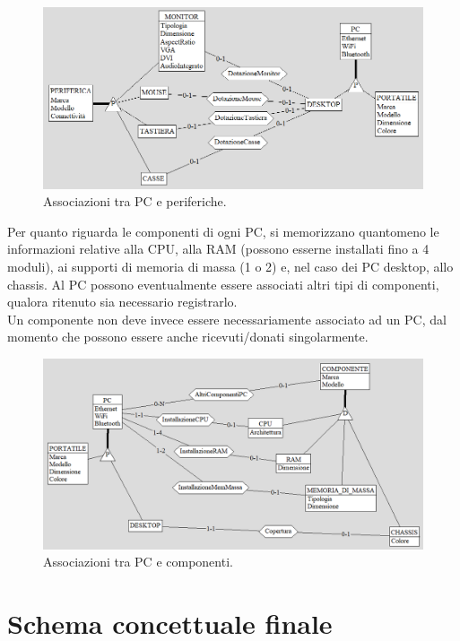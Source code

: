\documentclass[a4paper,12pt]{report}
\begin{document}
\begin{figure}[H]
	\centering
	\includegraphics[width=\textwidth]{images/periferiche-pc.png}
    \caption{Associazioni tra PC e periferiche.}
	\label{images:periferiche-pc}
\end{figure}

\noindent Per quanto riguarda le componenti di ogni PC, si memorizzano quantomeno le informazioni relative alla CPU, alla RAM (possono esserne installati fino a 4 moduli), ai supporti di memoria di massa (1 o 2) e, nel caso dei PC desktop, allo chassis. Al PC possono eventualmente essere associati altri tipi di componenti, qualora ritenuto sia necessario registrarlo. \\
Un componente non deve invece essere necessariamente associato ad un PC, dal momento che possono essere anche ricevuti/donati singolarmente.

\begin{figure}[H]
	\centering
	\includegraphics[width=\textwidth]{images/componenti-pc.png}
    \caption{Associazioni tra PC e componenti.}
	\label{images:componenti-pc}
\end{figure}

\section{Schema concettuale finale}
\end{document}
